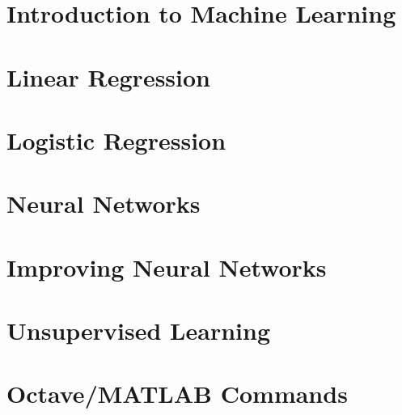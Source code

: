 \documentclass[12pt]{report}
\begin{document}
\tableofcontents

\chapter{Introduction to Machine Learning}


\chapter{Linear Regression}


\chapter{Logistic Regression}


\chapter{Neural Networks}


\chapter{Improving Neural Networks}


\chapter{Unsupervised Learning}


\chapter{Octave/MATLAB Commands}

\end{document}
